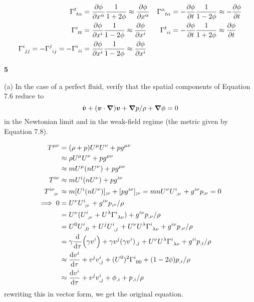 \documentclass[gr-notes.tex]{subfiles}
\begin{document}
\begin{align*}
  \tensor{\Gamma}{^t_{t\alpha}} &=
  \pdv{\phi}{x^\alpha} \frac{1}{1 + 2\phi} \approx
  \pdv{\phi}{x^\alpha} (1 - 2\phi)
  &
  \tensor{\Gamma}{^\alpha_{t\alpha}} &=
 -\pdv{\phi}{t} \frac{1}{1 - 2\phi} \approx
 -\pdv{\phi}{t} (1 + 2\phi)
  \\
  \tensor{\Gamma}{^i_{tt}} &=
  \pdv{\phi}{x^i} \frac{1}{1 - 2\phi} \approx
  \pdv{\phi}{x^i} (1 + 2\phi)
  &
  \tensor{\Gamma}{^t_{ii}} &=
 -\pdv{\phi}{t} \frac{1}{1 + 2\phi} \approx
  \pdv{\phi}{t} (1 - 2\phi)
  \\
  \tensor{\Gamma}{^i_{jj}} =
 -\tensor{\Gamma}{^j_{ij}} =
 -\tensor{\Gamma}{^i_{ii}} &=
  \pdv{\phi}{x^i} \frac{1}{1 - 2\phi} \approx
  \pdv{\phi}{x^i} (1 + 2\phi)
\end{align*}


\textbf{5}

(a) In the case of a perfect fluid, verify that the spatial components of Equation 7.6 reduce to
%
\begin{displaymath}
  \dot{\boldsymbol{v}} +
  (\boldsymbol{v} \cdot \grad) \boldsymbol{v} +
  \grad p / \rho +
  \grad \phi =
  0
\end{displaymath}
%
in the Newtonian limit and in the weak-field regime (the metric given by Equation 7.8).

\begin{align*}
  T^{\mu\nu} &=
  (\rho + p) U^\mu U^\nu + p g^{\mu\nu}
  \\ &\approx
  \rho U^\mu U^\nu + p g^{\mu\nu}
  \\ &\approx
  m U^\mu (n U^\nu) + p g^{\mu\nu}
  \\
  T^{i\nu} &\approx
  m U^i (n U^\nu) + p g^{i\nu}
  \\
  \tensor{T}{^{i\nu}_{;\nu}} &\approx
  m [ U^i (n U^\nu) ]_{;\nu} + [ p g^{i\nu} ]_{;\nu} =
  m n U^\nu \tensor{U}{^i_{;\nu}} + g^{i\nu} p_{;\nu} = 0
  \\ \implies
  0 &=
  U^\nu \tensor{U}{^i_{;\nu}} + g^{i\nu} p_{;\nu} / \rho
  \\ &=
  U^\nu (\tensor{U}{^i_{,\nu}} + U^\lambda \tensor{\Gamma}{^i_{\lambda\nu}}) +
  g^{i\nu} p_{,\nu} / \rho
  \\ &=
  U^0 \tensor{U}{^i_{,0}} +
  U^j \tensor{U}{^i_{,j}} +
  U^\nu U^\lambda \tensor{\Gamma}{^i_{\lambda\nu}} +
  g^{i\nu} p_{,\nu} / \rho
  \\ &=
  \gamma \dv{\tau} (\gamma v^i) +
  \gamma v^j (\gamma v^i)_{,j} +
  U^\nu U^\lambda \tensor{\Gamma}{^i_{\lambda\nu}} +
  g^{ii} p_{,i} / \rho
  \\ &\approx
  \dv{v^i}{\tau} +
  v^j v^i_{,j} +
  (U^0)^2 \tensor{\Gamma}{^i_{00}} +
  (1 - 2\phi) p_{,i} / \rho
  \\ &\approx
  \dv{v^i}{\tau} +
  v^j v^i_{,j} +
  \phi_{,i} +
  p_{,i} / \rho
\end{align*}
%
rewriting this in vector form, we get the original equation.
\end{document}

